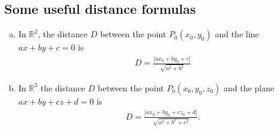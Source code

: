 \documentclass[12pt,letterpaper,reqno]{article}
\numberwithin{equation}{section}
\newcommand{\R}{\ensuremath{\mathbb R}}
\begin{document}
\subsection{Some useful distance formulas}
\begin{thm} \hspace{15cm}
	\begin{enumerate}[(a)]
		\item In $\R^2$, the distance $D$ between the point $P_0(x_0,y_0)$ and the line $ax+by+c=0$ is 
		\begin{align}\label{eq:line_dist_formula}
			D=\frac{|ax_0+by_0+c|}{\sqrt{a^2+b^2}}
		\end{align}
		\item In $\R^3$ the distance $D$ between the point $P_0(x_0,y_0,z_0)$ and the plane $ax+by+cz+d=0$ is 
		\begin{align}\label{eq:plane_dist_formula}
			D=\frac{|ax_0+by_0+cz_0+d|}{\sqrt{a^2+b^2+c^2}}.
		\end{align}
	\end{enumerate}
\end{thm}
\end{document}
